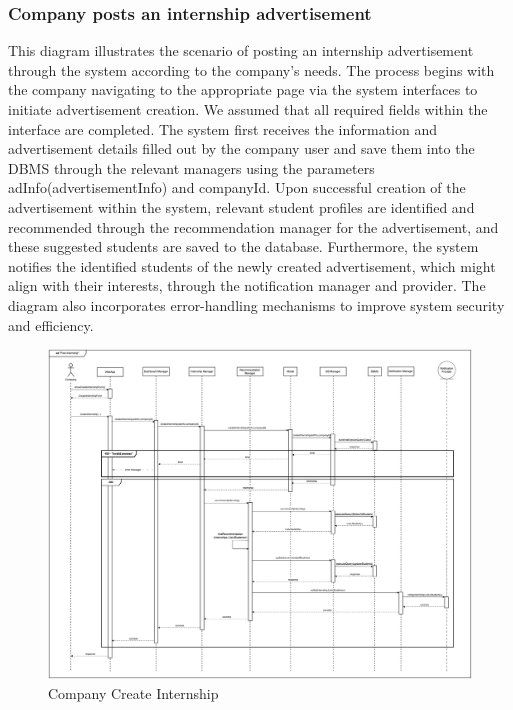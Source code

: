 \documentclass[a4paper,12pt]{article}
\begin{document}
\subsubsection*{ Company posts an internship advertisement}  
This diagram illustrates the scenario of posting an internship advertisement through the system according to the company's needs. The process begins with the company navigating to the appropriate page via the system interfaces to initiate advertisement creation. We assumed that all required fields within the interface are completed. The system first receives the information and advertisement details filled out by the company user and save them into the DBMS through the relevant managers using the parameters adInfo(advertisementInfo) and companyId. Upon successful creation of the advertisement within the system, relevant student profiles are identified and recommended through the recommendation manager for the advertisement, and these suggested students are saved to the database. Furthermore, the system notifies the identified students of the newly created advertisement, which might align with their interests, through the notification manager and provider. The diagram also incorporates error-handling mechanisms to improve system security and efficiency.

\begin{figure}[H]
    \centering
    \includegraphics[scale = 0.25]{DD_figures/SingleDiagrams/postInternship.drawio.png}
    \caption{Company Create Internship}
    \centering
\end{figure}
\newpage
\end{document}

